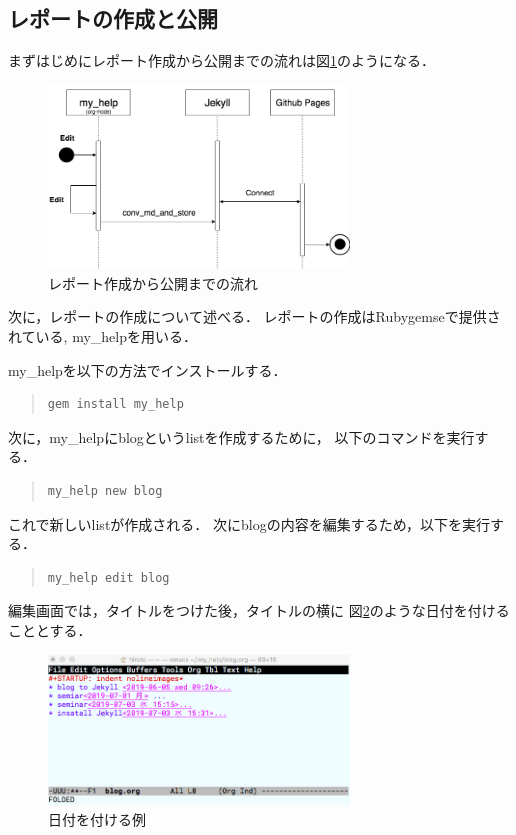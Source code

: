 \documentclass{hissymp}
\begin{document}
\subsection{レポートの作成と公開}
\label{sec:org3a0ed0f}
まずはじめにレポート作成から公開までの流れは図\ref{fig:org4619c31}のようになる．
\begin{figure}[htbp]
\centering
\includegraphics[width=8cm]{./images/myhelp_to_jekyll.png}
\caption{\label{fig:org4619c31}
レポート作成から公開までの流れ}
\end{figure}


次に，レポートの作成について述べる．
レポートの作成はRubygemseで提供されている,
my\_helpを用いる．

my\_helpを以下の方法でインストールする．
\begin{quote}
\begin{verbatim}
gem install my_help
\end{verbatim}
\end{quote}

次に，my\_helpにblogというlistを作成するために，
以下のコマンドを実行する．

\begin{quote}
\begin{verbatim}
my_help new blog
\end{verbatim}
\end{quote}

これで新しいlistが作成される．
次にblogの内容を編集するため，以下を実行する．
\begin{quote}
\begin{verbatim}
my_help edit blog
\end{verbatim}
\end{quote}

編集画面では，タイトルをつけた後，タイトルの横に
図\ref{fig:org81ed109}のような日付を付けることとする．
\begin{figure}[htbp]
\centering
\includegraphics[width=8cm]{./images/add_date.png}
\caption{\label{fig:org81ed109}
日付を付ける例}
\end{figure}
\end{document}
